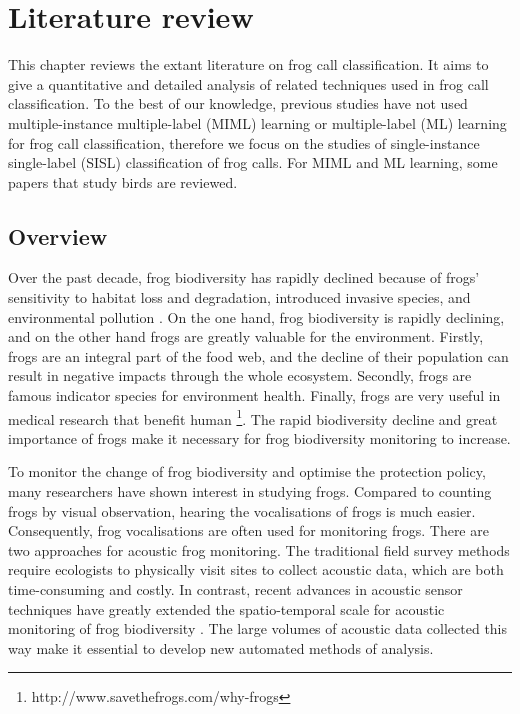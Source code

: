 
\chapter[Literature review]{Literature review}
\label{cha:cha2LiteratureReview}

This chapter reviews the extant literature on frog call classification. 
It aims to give a quantitative and detailed analysis of related techniques used in frog call classification. To the best of our knowledge, previous studies have not used multiple-instance multiple-label (MIML) learning or multiple-label (ML) learning for frog call classification, therefore we focus on the studies of single-instance single-label (SISL) classification of frog calls. For MIML and ML learning, some papers that study birds are reviewed.

\section{Overview}
\label{intro}
Over the past decade, frog biodiversity has rapidly declined because of frogs' sensitivity to habitat loss and degradation, introduced invasive species, and environmental pollution \citep{dudgeon2006freshwater}. On the one hand, frog biodiversity is rapidly declining, and on the other hand frogs are greatly valuable for the environment. Firstly, frogs are an integral part of the food web, and the decline of their population can result in negative impacts through the whole ecosystem. Secondly, frogs are famous indicator species for environment health. Finally, frogs are very useful in medical research that benefit human \footnote{http://www.savethefrogs.com/why-frogs}. The rapid biodiversity decline and great importance of frogs make it necessary for frog biodiversity monitoring to increase. 

To monitor the change of frog biodiversity and optimise the protection policy, many researchers have shown interest in studying frogs. Compared to counting frogs by visual observation, hearing the vocalisations of frogs is much easier. Consequently, frog vocalisations are often used for monitoring frogs. There are two approaches for acoustic frog monitoring. The traditional field survey methods require ecologists to physically visit sites to collect acoustic data, which are both time-consuming and costly. In contrast, recent advances in acoustic sensor techniques have greatly extended the spatio-temporal scale for acoustic monitoring of frog biodiversity \citep{wimmer2013analysing}. The large volumes of acoustic data collected this way make it essential to develop new automated methods of analysis. 


